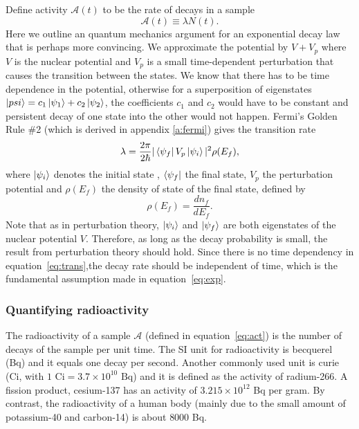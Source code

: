 \documentclass[nofootinbib,preprint,aip,pra]{revtex4-1}
\begin{document}
        Define activity $\mathcal{A}(t)$ to be the rate of decays in a sample
        \begin{equation} \label{eq:act}
            \mathcal{A}(t)\equiv \lambda N(t).
        \end{equation}
        Here we outline an quantum mechanics argument for an exponential decay law that is perhaps more
        convincing.
        We approximate the potential by $V+V_p$ where $V$ is the nuclear potential and $V_p$ is a small
        time-dependent perturbation that causes the transition between the states. We know that there has
        to be time dependence in the potential, otherwise for a superposition of eigenstates
        $\ket{psi}=c_1\ket{\psi_1} + c_2\ket{\psi_2}$, the coefficients $c_1$ and $c_2$ would 
        have to be constant and
        persistent decay of one state into the other would not happen.
        Fermi's Golden Rule \#2 (which is derived in appendix \ref{a:fermi})
        gives the transition rate
        \begin{equation}
            \label{eq:trans}
            \lambda = \frac{2\pi}{2\hbar}|\bra{\psi_f}V_p\ket{\psi_i}|^2\rho(E_f),
        \end{equation}
        where $\ket{\psi_i}$ denotes the initial state , $\bra{\psi_f}$ the final state, $V_p$ the perturbation
        potential and $\rho(E_f)$ the density of state of the final state, defined by
        \begin{equation}
            \rho(E_f) = \frac{dn_f}{dE_f}.
        \end{equation}
        Note that as in perturbation theory, $\ket{\psi_i}$ and
        $\ket{\psi_f}$ are both eigenstates of the nuclear potential $V$. Therefore, as long as
        the decay probability is small, the result from perturbation theory should hold. Since
        there is no time dependency in equation~\ref{eq:trans},the
        decay rate should be independent of time, which is the fundamental assumption made in
        equation~\ref{eq:exp}.

        \subsubsection{Quantifying radioactivity}
        The radioactivity of a sample $\mathcal{A}$ (defined in equation~\ref{eq:act}) 
        is the number of decays of the sample per unit time. The SI
        unit for radioactivity is becquerel (Bq) and it equals one decay per second. Another commonly used
        unit is curie (Ci, with $1\text{ Ci}=3.7\times 10^{10}\text{ Bq}$) and it is defined as
        the activity of radium-266. A fission product, cesium-137 has an activity of $3.215\times 10^{12}$ Bq
        per gram. By contrast, the radioactivity of a human body (mainly due to the small amount of 
        potassium-40 and carbon-14) is about $8000$ Bq.
\end{document}
